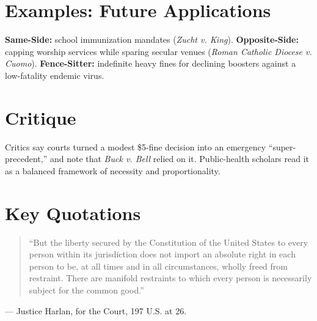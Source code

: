 \documentclass[12pt]{article}
\begin{document}
\section{Examples: Future Applications}
\textbf{Same-Side:} school immunization mandates (\textit{Zucht v. King}). \textbf{Opposite-Side:} capping worship services while sparing secular venues (\textit{Roman Catholic Diocese v. Cuomo}). \textbf{Fence-Sitter:} indefinite heavy fines for declining boosters against a low-fatality endemic virus.

\section{Critique}
Critics say courts turned a modest \$5-fine decision into an emergency ``super-precedent,'' and note that \textit{Buck v. Bell} relied on it. Public-health scholars read it as a balanced framework of necessity and proportionality.

\section{Key Quotations}
\begin{quote}
``But the liberty secured by the Constitution of the United States to every person within its jurisdiction does not import an absolute right in each person to be, at all times and in all circumstances, wholly freed from restraint. There are manifold restraints to which every person is necessarily subject for the common good.''
\end{quote}
\noindent --- Justice Harlan, for the Court, 197 U.S. at 26.
\end{document}
